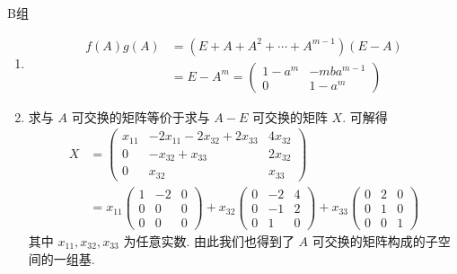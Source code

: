 \centerline{\heiti B组}
\begin{enumerate}
    \item \begin{align*}
              f(A) g(A) & = (E + A + A^2 + \cdots + A^{m - 1})(E - A) \\
                        & = E - A^m = \begin{pmatrix}
                                          1 - a^m & -mba^{m - 1} \\
                                          0       & 1 - a^m
                                      \end{pmatrix}
          \end{align*}

    \item 求与 $ A $ 可交换的矩阵等价于求与 $ A - E $ 可交换的矩阵 $ X $. 可解得
          \begin{align*}
              X & = \begin{pmatrix}
                        x_{11} & -2x_{11} - 2x_{32} + 2x_{33} & 4x_{32} \\
                        0      & -x_{32} + x_{33}             & 2x_{32} \\
                        0      & x_{32}                       & x_{33}
                    \end{pmatrix} \\
                & = x_{11} \begin{pmatrix}
                               1 & -2 & 0 \\
                               0 & 0  & 0 \\
                               0 & 0  & 0
                           \end{pmatrix}
              + x_{32} \begin{pmatrix}
                           0 & -2 & 4 \\
                           0 & -1 & 2 \\
                           0 & 1  & 0
                       \end{pmatrix}
              + x_{33} \begin{pmatrix}
                           0 & 2 & 0 \\
                           0 & 1 & 0 \\
                           0 & 0 & 1
                       \end{pmatrix}
          \end{align*}
          其中 $ x_{11}, x_{32}, x_{33} $ 为任意实数. 由此我们也得到了 $ A $ 可交换的矩阵构成的子空间的一组基.


\end{enumerate}
